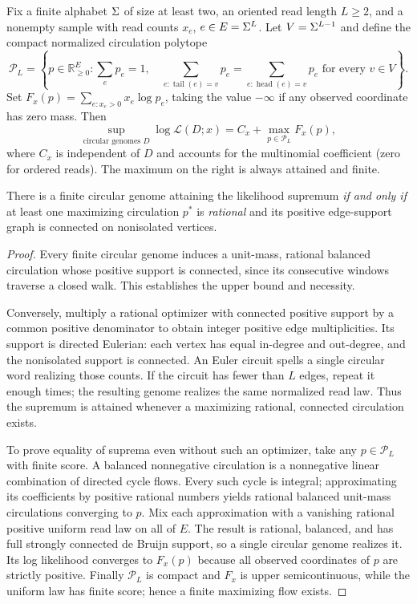 \begin{theorem}
\label{thm:flow-supremum-attainment}
Fix a finite alphabet $\Sigma$ of size at least two,
an oriented read length $L\ge2$, and a nonempty sample
with read counts $x_e$, $e\in E=\Sigma^L$.
Let $V=\Sigma^{L-1}$ and define the compact
normalized circulation polytope
\[
 \mathcal P_L=\left\{p\in\mathbb R_{\ge0}^E:
    \sum_e p_e=1,\quad
    \sum_{e:\operatorname{tail}(e)=v}p_e
    =\sum_{e:\operatorname{head}(e)=v}p_e
    \text{ for every }v\in V
 \right\}.
\]
Set $F_x(p)=\sum_{e:x_e>0}x_e\log p_e$,
taking the value $-\infty$ if any observed coordinate
has zero mass. Then
\[
 \sup_{\text{circular genomes }D}\log\mathcal L(D;x)
   = C_x+\max_{p\in\mathcal P_L}F_x(p),
\]
where $C_x$ is independent of $D$ and accounts
for the multinomial coefficient (zero for ordered reads).
The maximum on the right is always attained and finite.

There is a finite circular genome attaining the likelihood
supremum \emph{if and only if} at least one maximizing
circulation $p^*$ is \emph{rational} and its positive
edge-support graph is connected on nonisolated vertices.
\end{theorem}
\begin{proof}
Every finite circular genome induces a unit-mass,
rational balanced circulation whose positive support
is connected, since its consecutive windows traverse
a closed walk. This establishes the upper bound
and necessity.

Conversely, multiply a rational optimizer with connected
positive support by a common positive denominator to
obtain integer positive edge multiplicities. Its support
is directed Eulerian: each vertex has equal in-degree
and out-degree, and the nonisolated support is connected.
An Euler circuit spells a single circular word realizing
those counts. If the circuit has fewer than $L$ edges,
repeat it enough times; the resulting genome realizes
the same normalized read law. Thus the supremum is
attained whenever a maximizing rational, connected
circulation exists.

To prove equality of suprema even without such an optimizer,
take any $p\in\mathcal P_L$ with finite score.
A balanced nonnegative circulation is a nonnegative
linear combination of directed cycle flows. Every such
cycle is integral; approximating its coefficients by
positive rational numbers yields rational balanced
unit-mass circulations converging to $p$.
Mix each approximation with a vanishing rational
positive uniform read law on all of $E$.
The result is rational, balanced, and has full
strongly connected de Bruijn support, so a single
circular genome realizes it. Its log likelihood
converges to $F_x(p)$ because all observed coordinates
of $p$ are strictly positive. Finally $\mathcal P_L$
is compact and $F_x$ is upper semicontinuous, while
the uniform law has finite score; hence a finite
maximizing flow exists.
\end{proof}

